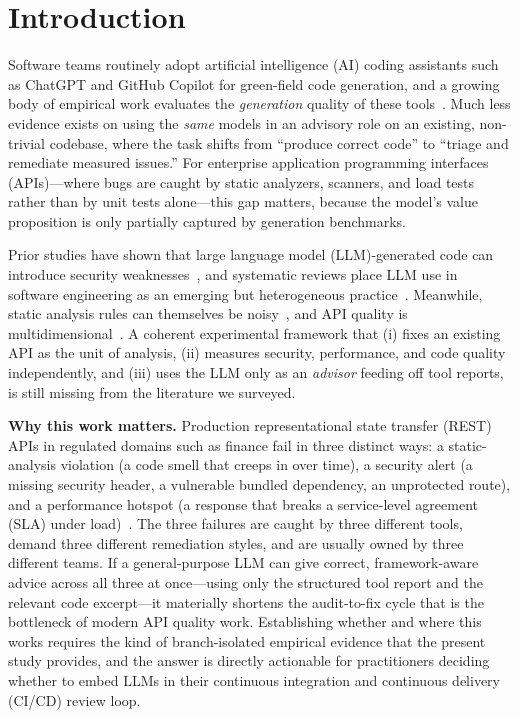 \documentclass[conference,letterpaper]{IEEEtran}
\begin{document}
\section{Introduction}
Software teams routinely adopt artificial intelligence (AI) coding assistants such as ChatGPT and GitHub Copilot for green-field code generation, and a growing body of empirical work evaluates the \emph{generation} quality of these tools~\cite{ref1,ref2,ref8,ref10}. Much less evidence exists on using the \emph{same} models in an advisory role on an existing, non-trivial codebase, where the task shifts from ``produce correct code'' to ``triage and remediate measured issues.'' For enterprise application programming interfaces (APIs)---where bugs are caught by static analyzers, scanners, and load tests rather than by unit tests alone---this gap matters, because the model's value proposition is only partially captured by generation benchmarks.

Prior studies have shown that large language model (LLM)-generated code can introduce security weaknesses~\cite{ref11,ref12,ref13}, and systematic reviews place LLM use in software engineering as an emerging but heterogeneous practice~\cite{ref14}. Meanwhile, static analysis rules can themselves be noisy~\cite{ref15}, and API quality is multidimensional~\cite{ref5}. A coherent experimental framework that (i) fixes an existing API as the unit of analysis, (ii) measures security, performance, and code quality independently, and (iii) uses the LLM only as an \emph{advisor} feeding off tool reports, is still missing from the literature we surveyed.

\textbf{Why this work matters.} Production representational state transfer (REST) APIs in regulated domains such as finance fail in three distinct ways: a static-analysis violation (a code smell that creeps in over time), a security alert (a missing security header, a vulnerable bundled dependency, an unprotected route), and a performance hotspot (a response that breaks a service-level agreement (SLA) under load)~\cite{ref5,ref16,ref17,ref18,ref19,ref20,ref21}. The three failures are caught by three different tools, demand three different remediation styles, and are usually owned by three different teams. If a general-purpose LLM can give correct, framework-aware advice across all three at once---using only the structured tool report and the relevant code excerpt---it materially shortens the audit-to-fix cycle that is the bottleneck of modern API quality work. Establishing whether and where this works requires the kind of branch-isolated empirical evidence that the present study provides, and the answer is directly actionable for practitioners deciding whether to embed LLMs in their continuous integration and continuous delivery (CI/CD) review loop.
\end{document}
